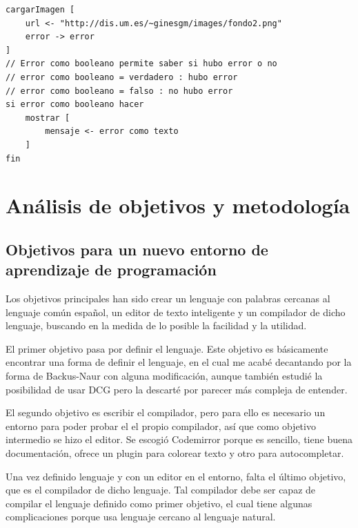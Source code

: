 \documentclass{report}
\begin{document}
	\vspace{10px}	

	\begin{BVerbatim}	
cargarImagen [
	url <- "http://dis.um.es/~ginesgm/images/fondo2.png"
	error -> error
]
// Error como booleano permite saber si hubo error o no
// error como booleano = verdadero : hubo error
// error como booleano = falso : no hubo error
si error como booleano hacer 
	mostrar [
		mensaje <- error como texto
	]
fin
	\end{BVerbatim}
	
	\chapter{Análisis de objetivos y metodología}
	
	\section{Objetivos para un nuevo entorno de aprendizaje de programación}
	
	Los objetivos principales han sido crear un lenguaje con palabras cercanas al lenguaje común español, un editor de texto inteligente y un compilador de dicho lenguaje, buscando en la medida de lo posible la facilidad y la utilidad. 
	
	\vspace{10px}
	
	El primer objetivo pasa por definir el lenguaje. Este objetivo es básicamente encontrar una forma de definir el lenguaje, en el cual me acabé decantando por la forma de Backus-Naur\cite{bnf} con alguna modificación, aunque también estudié la posibilidad de usar DCG\cite{dcg} pero la descarté por parecer más compleja de entender. 
	
	\vspace{10px}

	El segundo objetivo es escribir el compilador, pero para ello es necesario un entorno para poder probar el el propio compilador, así que como objetivo intermedio se hizo el editor. Se escogió Codemirror porque es sencillo, tiene buena documentación, ofrece un plugin para colorear texto\cite{codemirrorsyntaxhighlight} y otro para autocompletar\cite{codemirrorautocomplete}. 
	
	\vspace{10px}
	
	Una vez definido lenguaje y  con un editor en el entorno, falta el último objetivo, que es el compilador de dicho lenguaje. Tal compilador debe ser capaz de compilar el lenguaje definido como primer objetivo, el cual tiene algunas complicaciones porque usa lenguaje cercano al lenguaje natural.
	
\end{document}
